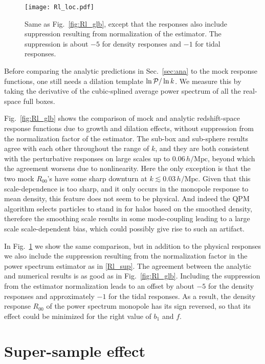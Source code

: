 \documentclass[a4paper,11pt]{article}
\let\d\relax
\DeclareMathOperator{\d}{d}
\newcommand{\Pdimless}{\mathcal{P}}
\newcommand{\Mpc}{\mathrm{Mpc}}
\newcommand{\hMpc}{{\,h/\Mpc}}
\begin{document}
\begin{figure}[tbp]
    \centering
    \texttt{[image: Rl\_loc.pdf]}
    \caption{Same as Fig.~\ref{fig:Rl_glb}, except that the responses also
    include suppression resulting from normalization of the estimator.  The
    suppression is about $-5$ for density responses and $-1$ for tidal
    responses.}
    \label{fig:Rl_loc}
\end{figure}

Before comparing the analytic predictions in Sec.~\ref{sec:ana} to the mock
response functions, one still needs a dilation template $\d\ln\Pdimless/\d\ln
k$.
We measure this by taking the derivative of the cubic-splined average power
spectrum of all the real-space full boxes.

Fig.~\ref{fig:Rl_glb} shows the comparison of mock and analytic redshift-space
response functions due to growth and dilation effects, without suppression from
the normalization factor of the estimator.
The sub-box and sub-sphere results agree with each other throughout the range
of $k$, and they are both consistent with the perturbative responses on
large scales up to $0.06\hMpc$, beyond which the agreement worsens due to
nonlinearity.
Here the only exception is that the two mock $R_{00}$'s have some sharp
downturn at $k\lesssim0.03\hMpc$.
Given that this scale-dependence is too sharp, and it only occurs in the
monopole response to mean density, this feature does not seem to be physical.
And indeed the QPM algorithm selects particles to stand in for halos based on
the smoothed density, therefore the smoothing scale results in some
mode-coupling leading to a large scale scale-dependent bias, which could
possibly give rise to such an artifact.

In Fig.~\ref{fig:Rl_loc} we show the same comparison, but in addition to the
physical responses we also include the suppression resulting from the
normalization factor in the power spectrum estimator as in \eqref{Rl_sup}.
The agreement between the analytic and numerical results is as good as in
Fig.~\ref{fig:Rl_glb}.
Including the suppression from the estimator normalization leads to an offset by
 about $-5$ for the density responses and
approximately $-1$ for the tidal responses.
As a result, the density response $R_{00}$ of the power spectrum monopole has
its sign reversed, so that its effect could be minimized for the right value
of $b_1$ and $f$.



\section{Super-sample effect}
\label{sec:ss}
\end{document}
